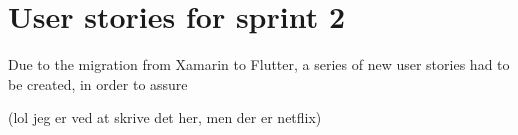 \section{User stories for sprint 2}
Due to the migration from Xamarin to Flutter, a series of new user stories had to be created, in order to assure 

(lol jeg er ved at skrive det her, men der er netflix)